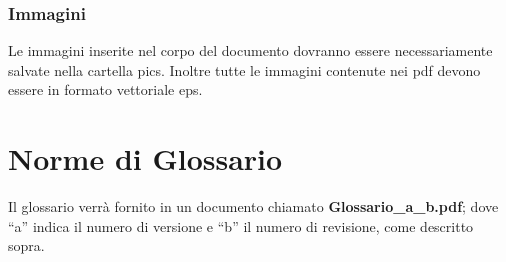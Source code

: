 \documentclass[11pt,titlepage,a4paper]{report}
\begin{document}
\subsubsection{Immagini}
Le immagini inserite nel corpo del documento dovranno essere necessariamente salvate nella cartella pics. Inoltre tutte le immagini contenute nei pdf devono essere in formato vettoriale eps.
\section{Norme di Glossario}
Il glossario verr\`a fornito in un documento chiamato \textbf{ Glossario\_a\_b.pdf}; dove ``a'' indica il numero di versione e ``b'' il numero di revisione, come descritto sopra.
\end{document}
